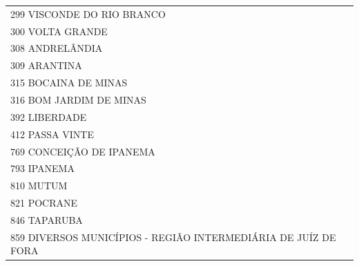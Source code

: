 \documentclass{article}
\begin{document}
\begin{longtable}[c]{m{18cm}}
\multicolumn{1}{l}{ \hspace{2em} 299 VISCONDE DO RIO BRANCO } \\
\multicolumn{1}{l}{ \hspace{2em} 300 VOLTA GRANDE } \\
\multicolumn{1}{l}{ \hspace{2em} 308 ANDRELÂNDIA } \\
\multicolumn{1}{l}{ \hspace{2em} 309 ARANTINA } \\
\multicolumn{1}{l}{ \hspace{2em} 315 BOCAINA DE MINAS } \\
\multicolumn{1}{l}{ \hspace{2em} 316 BOM JARDIM DE MINAS } \\
\multicolumn{1}{l}{ \hspace{2em} 392 LIBERDADE } \\
\multicolumn{1}{l}{ \hspace{2em} 412 PASSA VINTE } \\
\multicolumn{1}{l}{ \hspace{2em} 769 CONCEIÇÃO DE IPANEMA } \\
\multicolumn{1}{l}{ \hspace{2em} 793 IPANEMA } \\
\multicolumn{1}{l}{ \hspace{2em} 810 MUTUM } \\
\multicolumn{1}{l}{ \hspace{2em} 821 POCRANE } \\
\multicolumn{1}{l}{ \hspace{2em} 846 TAPARUBA } \\
\multicolumn{1}{l}{ \hspace{2em} 859 DIVERSOS MUNICÍPIOS - REGIÃO INTERMEDIÁRIA DE JUÍZ DE FORA } \\
\end{longtable}
\newpage
\end{document}
